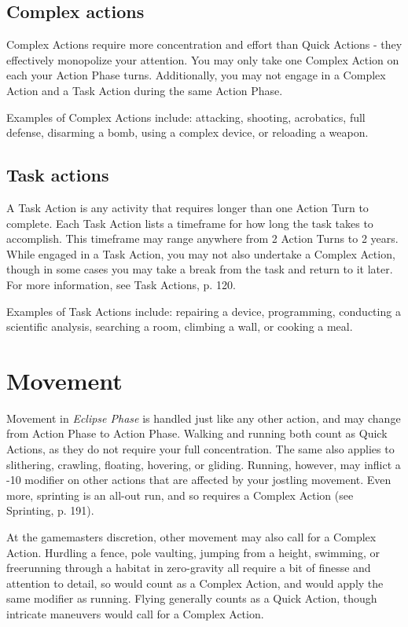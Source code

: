 \subsection{Complex actions}
\label{sec:combat-complex-actions}

Complex Actions require more concentration and effort than Quick Actions - they effectively monopolize your attention. You may only take one Complex Action on each your Action Phase turns. Additionally, you may not engage in a Complex Action and a Task Action during the same Action Phase.

Examples of Complex Actions include: attacking, shooting, acrobatics, full defense, disarming a bomb, using a complex device, or reloading a weapon.


\subsection{Task actions}
\label{sec:combat-task-actions}

A Task Action is any activity that requires longer than one Action Turn to complete. Each Task Action lists a timeframe for how long the task takes to accomplish. This timeframe may range anywhere from 2 Action Turns to 2 years. While engaged in a Task Action, you may not also undertake a Complex Action, though in some cases you may take a break from the task and return to it later. For more information, see Task Actions, p. 120.

Examples of Task Actions include: repairing a device, programming, conducting a scientific analysis, searching a room, climbing a wall, or cooking a meal.


\section{Movement}
\label{sec:combat-movement}

Movement in \emph{Eclipse Phase} is handled just like any other action, and may change from Action Phase to Action Phase. Walking and running both count as Quick Actions, as they do not require your full concentration. The same also applies to slithering, crawling, floating, hovering, or gliding. Running, however, may inflict a -10 modifier on other actions that are affected by your jostling movement. Even more, sprinting is an all-out run, and so requires a Complex Action (see Sprinting, p. 191).

At the gamemasters discretion, other movement may also call for a Complex Action. Hurdling a fence, pole vaulting, jumping from a height, swimming, or freerunning through a habitat in zero-gravity all require a bit of finesse and attention to detail, so would count as a Complex Action, and would apply the same modifier as running. Flying generally counts as a Quick Action, though intricate maneuvers would call for a Complex Action.


